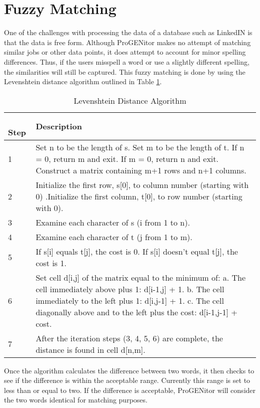 \section{Fuzzy Matching}
\label{sect:fuzzy-matching}
One of the challenges with processing the data of a database such as LinkedIN is
that the data is free form.  Although ProGENitor makes no attempt of matching
similar jobs or other data points, it does attempt to account for minor spelling
differences.  Thus, if the users misspell a word or use a slightly different
spelling, the similarities will still be captured. This fuzzy matching is
done by using the Levenshtein distance algorithm\cite{fuzzy} outlined in Table
\ref{tab:lev-dist}.  

\begin{table}[H]
  \centering
  \begin{tabular}{|p{.5in}|p{4in}|}
  \hline
  \
  Step & Description \\
  \hline\hline
  1 &  Set n to be the length of s.\newline 
  Set m to be the length of t.\newline
  If n = 0, return m and exit.\newline
  If m = 0, return n and exit.\newline
  Construct a matrix containing m+1 rows and n+1 columns.  \\ \hline 
  2 &  	Initialize the first row, s[0], to column number (starting with
  0) .\newline Initialize the first column, t[0], to row number (starting
  with 0).\\
  \hline 3 & Examine each character of s (i from 1 to n). \\ \hline 4 & Examine each character of t (j from 1 to m). \\ \hline
  5 &  	If s[i] equals t[j], the cost is 0.\newline
  If s[i] doesn't equal t[j], the cost is 1. \\\hline 
  6 &  	Set cell d[i,j] of the matrix equal to the minimum of:\newline
  a. The cell immediately above plus 1: d[i-1,j] + 1.\newline
  b. The cell immediately to the left plus 1: d[i,j-1] + 1.\newline
  c. The cell diagonally above and to the left plus the cost: d[i-1,j-1] + cost.\\ \hline
  7 & After the iteration steps (3, 4, 5, 6) are complete, the distance is found in cell d[n,m]. \\ \hline
  \end{tabular}
  \caption{Levenshtein Distance Algorithm}
  \label{tab:lev-dist}
\end{table}

Once the algorithm calculates the difference between two
words, it then checks to see if the difference is within the acceptable range. 
Currently this range is set to less than or equal to two.  If the difference is
acceptable, ProGENitor will consider the two words identical for matching
purposes.


